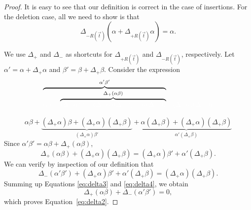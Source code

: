 \begin{proof}
It is easy to see that our definition is correct in the case of insertions.
For the deletion case, all we need to show is that
\begin{equation}
\Delta_{-R(\vec{t})}(\alpha + \Delta_{+R(\vec{t})} \alpha) = \alpha.
\label{eq:delta2}
\end{equation}


\def\dtp{\Delta_{+}}
\def\dtm{\Delta_{-}}


We use $\dtp$ and $\dtm$ as shortcuts for $\Delta_{+R(\vec{t})}$
and $\Delta_{-R(\vec{t})}$, respectively.
Let $\alpha' = \alpha+\dtp\alpha$ and $\beta' = \beta+\dtp\beta$.
Consider the expression
\[
\overbrace{\color{white}{\alpha\beta +
\color{black}{\overbrace{\color{white}{
(\dtp \alpha)\beta + (\dtp \alpha)(\dtp \beta)
+ \alpha(\dtp \beta)}}^{\dtp (\alpha\beta)}}}}^{\alpha' \beta'}
\color{white}{+ (\dtp \alpha)(\dtp \beta)}
\]

\vspace{-14mm}

\[
\alpha\beta +
\underbrace{(\dtp \alpha)\beta + (\dtp \alpha)(\dtp \beta)}_{
(\dtp \alpha)\beta'}
+ \underbrace{
\alpha(\dtp \beta) + (\dtp \alpha)(\dtp \beta)}_{\alpha'(\dtp \beta)}
\]
Since $\alpha'\beta' = \alpha\beta + \dtp(\alpha\beta)$,
\begin{equation}
\dtp(\alpha\beta) + (\dtp\alpha)(\dtp\beta) =
(\dtp \alpha)\beta' + \alpha'(\dtp \beta).
\label{eq:delta3}
\end{equation}
We can verify by inspection of our definition that
\begin{equation}
\dtm(\alpha'\beta') + (\dtp \alpha)\beta' + \alpha'(\dtp \beta) =
(\dtp\alpha)(\dtp\beta).
\label{eq:delta4}
\end{equation}
Summing up Equations \ref{eq:delta3} and \ref{eq:delta4}, we obtain
\[
\dtp(\alpha\beta) + \dtm(\alpha'\beta') = 0,
\]
which proves Equation~\ref{eq:delta2}.
\end{proof}


\def\duv{\Delta_{\pm R(u,v)}}

